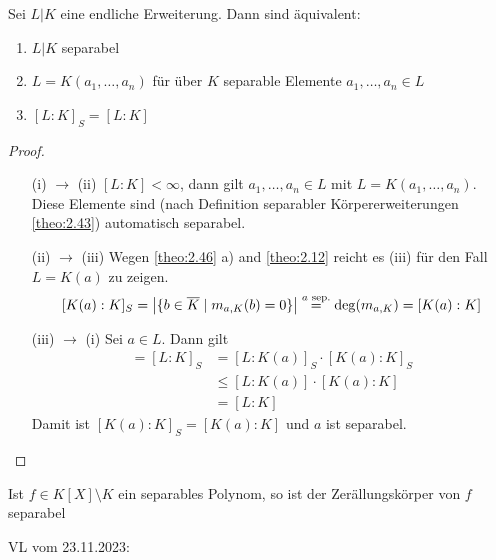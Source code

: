 \documentclass[../main.tex]{subfiles}
\begin{document}
\begin{theorem}
    Sei $L|K$ eine endliche Erweiterung. Dann sind äquivalent:
    \begin{enumerate}[label=(\roman*)]
        \item $L|K$ separabel
        \item $L=K(a_1, \dots, a_n)$ für über $K$ separable Elemente $a_1, \dots, a_n \in L$
        \item $[L:K]_S = [L:K]$
    \end{enumerate}
\end{theorem}
\begin{proof}
$ $
    \begin{itemize}[align= left]
        \item[(i) $\rightarrow$ (ii)] $[L:K] < \infty$, dann gilt $a_1, \dots, a_n \in L$ mit $L=K(a_1, \dots, a_n)$. Diese Elemente sind (nach Definition separabler Körpererweiterungen \cref{theo:2.43}) automatisch separabel.
        \item[(ii) $\rightarrow$ (iii)] Wegen \cref{theo:2.46} a) and \cref{theo:2.12} reicht es (iii) für den Fall $L=K(a)$ zu zeigen.
        $$[K(a):K]_S=\left\vert \{b\in \overline{K}\mid m_{a,K}(b)=0\} \right\vert \overset{a\text{ sep.}}{=}\deg(m_{a,K}) = [K(a):K]$$
        \item[(iii) $\rightarrow$ (i)] Sei $a\in L$. Dann gilt
        \begin{align*}
            [L:K] = [L:K]_S &= [L:K(a)]_S \cdot [K(a):K]_S\\
            &\leq [L:K(a)] \cdot [K(a):K]\\
            &= [L:K]
        \end{align*}
        Damit ist $[K(a):K]_S = [K(a):K]$ und $a$ ist separabel.
    \end{itemize}
\end{proof}
\begin{corollary}
    Ist $f\in K[X]\setminus K$ ein separables Polynom, so ist der Zerällungskörper von $f$ separabel
\end{corollary}


\begin{flushright}
VL vom 23.11.2023:
\end{flushright}
\end{document}
